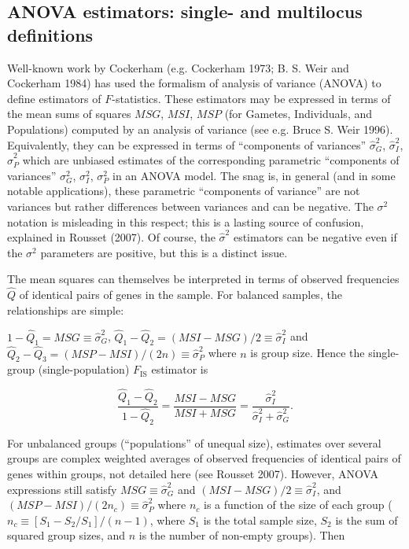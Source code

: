 \documentclass[
  12pt,
]{book}
\begin{document}
\hypertarget{Fmulti}{%
\subsection{ANOVA estimators: single- and multilocus definitions}\label{Fmulti}}

Well-known work by Cockerham (e.g. Cockerham 1973; B. S. Weir and Cockerham 1984) has used the formalism of analysis of variance (ANOVA) to define estimators of \(F\)-statistics. These estimators may be expressed in terms of the mean sums of squares \(MSG\), \(MSI\), \(MSP\) (for Gametes, Individuals, and Populations) computed by an analysis of variance (see e.g. Bruce S. Weir 1996). Equivalently, they can be expressed in terms of ``components of variances'' \(\hat{\sigma}^2_G\), \(\hat{\sigma}^2_I\), \(\hat{\sigma}^2_P\) which are unbiased estimates of the corresponding parametric ``components of variances'' \(\sigma^2_G\), \(\sigma^2_I\), \(\sigma^2_P\) in an ANOVA model. The snag is, in general (and in some notable applications), these parametric ``components of variance'' are not variances but rather differences between variances and can be negative. The \(\sigma^2\) notation is misleading in this respect; this is a lasting source of confusion, explained in Rousset (2007). Of course, the \(\hat{\sigma}^2\) estimators can be negative even if the \(\sigma^2\) parameters are positive, but this is a distinct issue.

The mean squares can themselves be interpreted in terms of observed
frequencies \(\hat{Q}\) of identical pairs of genes in the sample. For
balanced samples, the relationships are simple:

\(1-\hat{Q}_1=MSG\equiv \hat{\sigma}^2_G\),
\(\hat{Q}_1-\hat{Q}_2=(MSI-MSG)/2\equiv \hat{\sigma}^2_I\) and
\(\hat{Q}_2-\hat{Q}_3=(MSP-MSI)/(2n)\equiv \hat{\sigma}^2_P\) where \(n\) is group size. Hence the single-group (single-population) \(F_\mathrm{IS}\) estimator is

\[\label{}
    \frac{\hat{Q}_1-\hat{Q}_2}{1-\hat{Q}_2}=
    \frac{MSI-MSG}{MSI+MSG}=
    \frac{\hat{\sigma}^2_I}{\hat{\sigma}^2_I+\hat{\sigma}^2_G}.\]

For unbalanced groups (``populations'' of unequal size), estimates over several groups are complex weighted averages of observed frequencies of identical pairs of genes within groups, not detailed here (see Rousset 2007). However, ANOVA expressions still satisfy \(MSG\equiv \hat{\sigma}^2_G\) and \((MSI-MSG)/2\equiv \hat{\sigma}^2_I\), and \((MSP-MSI)/(2n_c)\equiv \hat{\sigma}^2_P\) where \(n_c\) is a function of the size of each group (\(n_c\equiv [S_1-S_2/S_1]/(n-1)\), where \(S_1\) is the total sample size, \(S_2\) is the sum of squared group sizes, and \(n\) is the number of non-empty groups). Then
\end{document}

